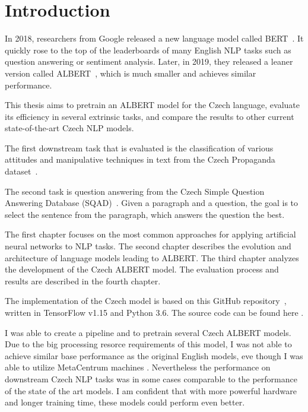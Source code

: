 \documentclass[
  digital, %
  table,   %
  twoside, %
  lof,     %
  lot,     %
]{fithesis3}
\begin{document}
\chapter*{Introduction}


In 2018, researchers from Google released a new language model called BERT~\parencite{bert}. It quickly rose to the top of the leaderboards of many English NLP tasks such as question answering or sentiment analysis. Later, in 2019, they released a leaner version called ALBERT~\parencite{albert}, which is much smaller and achieves similar performance.

This thesis aims to pretrain an ALBERT model for the Czech language, evaluate its efficiency in several extrinsic tasks, and compare the results to other current state-of-the-art Czech NLP models. 

The first downstream task that is evaluated is the classification of various attitudes and manipulative techniques in text from the Czech Propaganda dataset~\parencite{propaganda}. 

The second task is question answering from the Czech Simple Question Answering Database (SQAD)~\cite{sqad1, sqad2}. Given a paragraph and a question, the goal is to select the sentence from the paragraph, which answers the question the best.

The first chapter focuses on the most common approaches for applying artificial neural networks to NLP tasks. The second chapter describes the evolution and architecture of language models leading to ALBERT. The third chapter analyzes the development of the Czech ALBERT model. The evaluation process and results are described in the fourth chapter.

The implementation of the Czech model is based on this GitHub repository~\parencite{albert_repo}, written in TensorFlow v1.15 and Python 3.6. The source code can be found here \parencite{thesis_repo}.

I was able to create a pipeline and to pretrain several Czech ALBERT models. Due to the big processing resorce  requirements of this model, I was not able to achieve similar base performance as the original English models, eve though I was able to utilize MetaCentrum machines \parencite{metacentrum}. Nevertheless the performance on downstream Czech NLP tasks was in some cases comparable to the performance of the state of the art models. I am confident that with more powerful hardware and longer training time, these models could perform even better.
\end{document}
